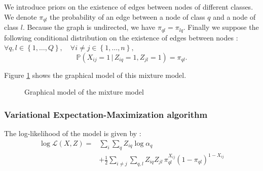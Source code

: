 \documentclass[switch, 12pt]{article}
\begin{document}
\begin{multicols}{2}
    We introduce priors on the existence of edges between nodes of different classes. We denote $\pi_{ql}$ the probability of an edge between a node of class $q$ and a node of class $l$. Because the graph is undirected, we have $\pi_{ql}=\pi_{lq}$. Finally we suppose the following conditional distribution on the existence of edges between nodes : $ \forall q,l\in \left\{1,\dots,Q\right\}, \quad \forall i\neq j\in \left\{1,\dots,n\right\},$
    \begin{equation}
        \label{eq:conditional_distribution}
        \mathbb{P}(X_{ij}=1\,|\,Z_{iq}=1,Z_{jl}=1)=\pi_{ql}.
    \end{equation}

    Figure \ref{fig:graphical_model} shows the graphical model of this mixture model.

    \begin{figure}[H]
        \centering
        \caption{Graphical model of the mixture model}
        \label{fig:graphical_model}
    \end{figure}


    \subsubsection{Variational Expectation-Maximization algorithm}

    The log-likelihood of the model is given by :
    \begin{equation}
        \begin{aligned}
            \log \mathcal{L}(X, Z) = & \sum_{i}\sum_{q} Z_{iq}\log\alpha_q                                                            \\
                                     & + \frac{1}{2}\sum_{i\neq j}\sum_{q,l} Z_{iq}Z_{jl} \, \pi_{ql}^{X_{ij}}(1-\pi_{ql})^{1-X_{ij}}
        \end{aligned}
    \end{equation}


\end{multicols}
\end{document}
